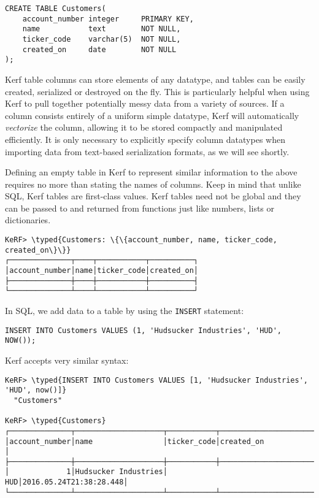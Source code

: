 \documentclass{article}
\newcommand{\typed}[1]{\textcolor{TealBlue}{#1}}
\begin{document}
\begin{Verbatim}
CREATE TABLE Customers(
	account_number integer     PRIMARY KEY,
	name           text        NOT NULL,
	ticker_code    varchar(5)  NOT NULL,
	created_on     date        NOT NULL
);
\end{Verbatim}

Kerf table columns can store elements of any datatype, and tables can be easily created, serialized or destroyed on the fly. This is particularly helpful when using Kerf to pull together potentially messy data from a variety of sources. If a column consists entirely of a uniform simple datatype, Kerf will automatically \emph{vectorize} the column, allowing it to be stored compactly and manipulated efficiently. It is only necessary to explicitly specify column datatypes when importing data from text-based serialization formats, as we will see shortly.

\pagebreak

Defining an empty table in Kerf to represent similar information to the above requires no more than stating the names of columns. Keep in mind that unlike SQL, Kerf tables are first-class values. Kerf tables need not be global and they can be passed to and returned from functions just like numbers, lists or dictionaries.

\begin{Verbatim}
KeRF> \typed{Customers: \{\{account_number, name, ticker_code, created_on\}\}}
┌──────────────┬────┬───────────┬──────────┐
│account_number│name│ticker_code│created_on│
├──────────────┼────┼───────────┼──────────┤
└──────────────┴────┴───────────┴──────────┘
\end{Verbatim}

In SQL, we add data to a table by using the \texttt{INSERT} statement:
\begin{Verbatim}
INSERT INTO Customers VALUES (1, 'Hudsucker Industries', 'HUD', NOW());
\end{Verbatim}

Kerf accepts very similar syntax:
\begin{Verbatim}
KeRF> \typed{INSERT INTO Customers VALUES [1, 'Hudsucker Industries', 'HUD', now()]}
  "Customers"

KeRF> \typed{Customers}
┌──────────────┬────────────────────┬───────────┬───────────────────────┐
│account_number│name                │ticker_code│created_on             │
├──────────────┼────────────────────┼───────────┼───────────────────────┤
│             1│Hudsucker Industries│        HUD│2016.05.24T21:38:28.448│
└──────────────┴────────────────────┴───────────┴───────────────────────┘
\end{Verbatim}
\end{document}

